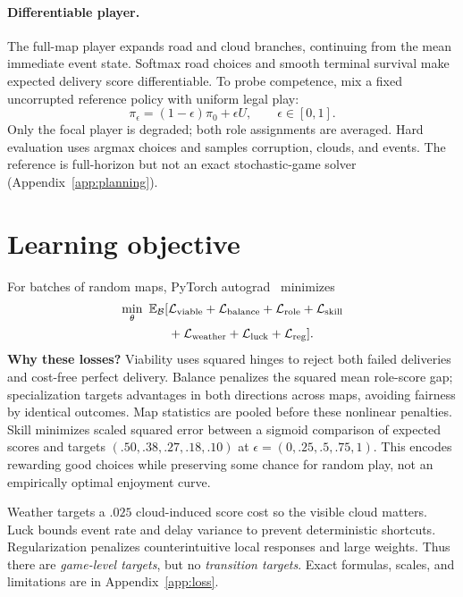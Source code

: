 \documentclass{article}
\begin{document}
\paragraph{Differentiable player.}
The full-map player expands road and cloud branches, continuing from the mean
immediate event state. Softmax road choices and smooth terminal survival make
expected delivery score differentiable. To probe competence, mix a fixed
uncorrupted reference policy with uniform legal play:
\begin{equation}
 \pi_\epsilon=(1-\epsilon)\pi_0+\epsilon U,
 \qquad \epsilon\in[0,1].
 \label{eq:epsilon}
\end{equation}
Only the focal player is degraded; both role assignments are averaged. Hard
evaluation uses argmax choices and samples corruption, clouds, and events.
The reference is full-horizon but not an exact stochastic-game solver
(Appendix~\ref{app:planning}).

\section{Learning objective}

For batches of random maps, PyTorch autograd~\cite{paszke2019pytorch} minimizes
\begin{equation}
\begin{aligned}
 \min_\theta\ \mathbb E_{\mathcal B}[{}&\mathcal L_{\rm viable}+\mathcal L_{\rm balance}
 +\mathcal L_{\rm role}+\mathcal L_{\rm skill}\\
 &+\mathcal L_{\rm weather}+\mathcal L_{\rm luck}
 +\mathcal L_{\rm reg}].
\end{aligned}
 \label{eq:objective}
\end{equation}
\textbf{Why these losses?} Viability uses squared hinges to reject both failed
deliveries and cost-free perfect delivery. Balance penalizes the squared mean
role-score gap; specialization targets advantages in both directions across
maps, avoiding fairness by identical outcomes. Map statistics are pooled before
these nonlinear penalties. Skill minimizes scaled squared error between a
sigmoid comparison of expected scores and targets $(.50,.38,.27,.18,.10)$ at
$\epsilon=(0,.25,.5,.75,1)$. This encodes rewarding good choices while preserving
some chance for random play, not an empirically optimal enjoyment curve.

Weather targets a $.025$ cloud-induced score cost so the visible cloud matters.
Luck bounds event rate and delay variance to prevent deterministic shortcuts.
Regularization penalizes counterintuitive local responses and large weights.
Thus there are \emph{game-level targets}, but no \emph{transition targets}.
Exact formulas, scales, and limitations are in Appendix~\ref{app:loss}.
\end{document}
